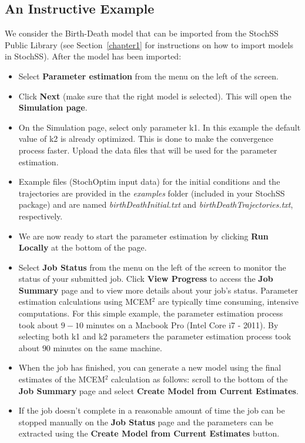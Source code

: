 \subsection{An Instructive Example}
We consider the Birth-Death model that can be imported from the StochSS Public Library (see Section~\ref{chapter1} for instructions on how to import models in StochSS).
After the model has been imported:
\begin{itemize}
\item Select \textbf{Parameter estimation} from the menu on the left of the screen.
\item Click \textbf{Next} (make sure that the right model is selected). This will open the \textbf{Simulation page}.
\item On the Simulation page, select only parameter k1. In this example the default value of k2 is already optimized. This is done to make the convergence process faster. Upload the data files that will be used for the parameter estimation.
\item Example files (StochOptim input data) for the initial conditions and the trajectories are provided in the \textit{examples} folder (included in your StochSS package) and are named \textit{birthDeathInitial.txt} and \textit{birthDeathTrajectories.txt}, respectively.
\item We are now ready to start the parameter estimation by clicking \textbf{Run Locally} at the bottom of the page. 
\item Select \textbf{Job Status} from the menu on the left of the screen to monitor the status of your submitted job.
Click \textbf{View Progress} to access the \textbf{Job Summary} page and to view more details about your job's status. Parameter estimation calculations using MCEM$^2$ are typically time consuming, intensive computations. For this simple example, the parameter estimation process took about $9-10$ minutes on a Macbook Pro (Intel Core i7 - 2011). By selecting both k1 and k2 parameters the parameter estimation process took about $90$ minutes on the same machine.

\item When the job has finished, you can generate a new model using the final estimates of the MCEM$^2$ calculation as follows: scroll to the bottom of the \textbf{Job Summary} page and select \textbf{Create Model from Current Estimates}. 
\item If the job doesn't complete in a reasonable amount of time the job can be stopped manually on the \textbf{Job Status} page and the parameters can be extracted using the \textbf{Create Model from Current Estimates} button.
\end{itemize}


